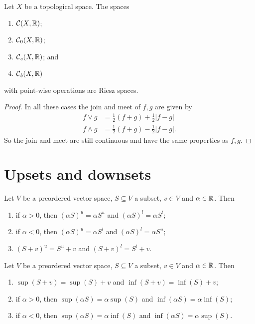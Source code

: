 \begin{lemma}
Let $X$ be a topological space. The spaces
\begin{enumerate}
\item $\operatorname{\mathcal{C}}(X,\mathbb{R})$;
\item $\operatorname{\mathcal{C}}_0(X,\mathbb{R})$;
\item $\operatorname{\mathcal{C}}_c(X,\mathbb{R})$; and
\item $\operatorname{\mathcal{C}}_b(X,\mathbb{R})$
\end{enumerate}
with point-wise operations are Riesz spaces.
\end{lemma}
\begin{proof}
In all these cases the join and meet of $f,g$ are given by
\begin{align*}
f \vee g &= \frac{1}{2}(f+g)+ \frac{1}{2}|f-g| \\
f \wedge g &= \frac{1}{2}(f+g) - \frac{1}{2}|f-g|.
\end{align*}
So the join and meet are still continuous and have the same properties as $f,g$.
\end{proof}

\section{Upsets and downsets}
\begin{lemma} \label{sumMultipleUpDownsets}
Let $V$ be a preordered vector space, $S\subseteq V$ a subset, $v\in V$ and $\alpha\in \mathbb{R}$. Then
\begin{enumerate}
\item if $\alpha > 0$, then $(\alpha S)^u = \alpha S^u$ and $(\alpha S)^l = \alpha S^l$;
\item if $\alpha < 0$, then $(\alpha S)^u = \alpha S^l$ and $(\alpha S)^l = \alpha S^u$;
\item $(S+v)^u = S^u + v$ and $(S+v)^l = S^l + v$.
\end{enumerate}
\end{lemma}
\begin{corollary}
Let $V$ be a preordered vector space, $S\subseteq V$ a subset, $v\in V$ and $\alpha\in \mathbb{R}$. Then
\begin{enumerate}
\item $\sup(S+v) = \sup(S)+v$ and $\inf(S+v) = \inf(S)+v$;
\item if $\alpha > 0$, then $\sup(\alpha S) = \alpha \sup(S)$ and $\inf(\alpha S) = \alpha \inf(S)$;
\item if $\alpha < 0$, then $\sup(\alpha S) = \alpha \inf(S)$ and $\inf(\alpha S) = \alpha \sup(S)$.
\end{enumerate}
\end{corollary}

